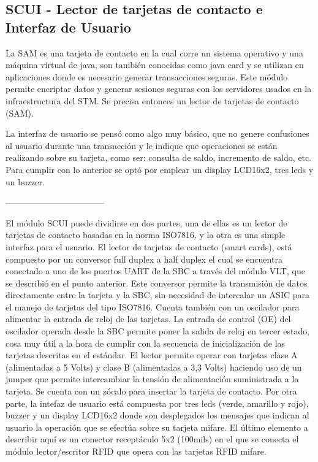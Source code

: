 \subsection{SCUI - Lector de tarjetas de contacto e Interfaz de Usuario}
La SAM es una tarjeta de contacto en la cual corre un sistema operativo y una máquina virtual de java, son también conocidas como java card y se utilizan en aplicaciones donde es necesario generar transacciones seguras. Este módulo permite encriptar datos y generar sesiones seguras con los servidores usados en la infraestructura del STM. Se precisa entonces un lector de tarjetas de contacto (SAM).


La interfaz de usuario se pensó como algo muy básico, que no genere confusiones al usuario durante una transacción y le indique que operaciones se están realizando sobre su tarjeta, como ser: consulta de saldo, incremento de saldo, etc. Para cumplir con lo anterior se optó por emplear un display LCD16x2, tres leds y un buzzer.

\bigskip
-----------------------------------
\bigskip

El módulo SCUI puede dividirse en dos partes, una de ellas es un lector de tarjetas de contacto basadas en la norma ISO7816, y la otra es una simple interfaz para el usuario.
El lector de tarjetas de contacto (smart cards), está compuesto por un conversor full duplex a half duplex el cual se encuentra conectado a uno de los puertos UART de la SBC a través del módulo VLT, que se describió en el punto anterior. Este conversor permite la transmisión de datos directamente entre la tarjeta y la SBC, sin necesidad de intercalar un ASIC para el manejo de tarjetas del tipo ISO7816. Cuenta también con un oscilador para alimentar la entrada de reloj de las tarjetas. La entrada de control (OE) del oscilador operada desde la SBC permite poner la salida de reloj en tercer estado, cosa muy útil a la hora de cumplir con la secuencia de inicialización de las tarjetas descritas en el estándar. El lector permite operar con tarjetas clase A (alimentadas a 5 Volts) y clase B (alimentadas a 3,3 Volts) haciendo uso de un jumper que permite intercambiar la tensión de alimentación suministrada a la tarjeta. Se cuenta con un zócalo para insertar la tarjeta de contacto.
Por otra parte, la intefaz de usuario está compuesta por tres leds (verde, amarillo y rojo), buzzer y un display LCD16x2 donde son desplegados los mensajes que indican al usuario la operación que se efectúa sobre su tarjeta mifare.
El último elemento a describir aquí es un conector receptáculo 5x2 (100mils) en el que se conecta el módulo lector/escritor RFID que opera con las tarjetas RFID mifare.

